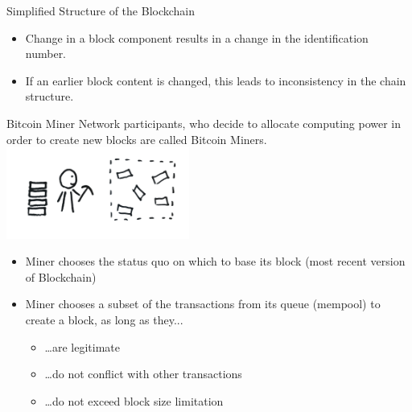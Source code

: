 \documentclass[]{beamer}
\begin{document}
\begin{frame}{Simplified Structure of the Blockchain}
\begin{figure}[h!]
	\center
	
\end{figure}
\begin{itemize}
\item{Change in a block component results in a change in the identification number.}
\item{If an earlier block content is changed, this leads to inconsistency in the chain structure.}
\end{itemize}
\end{frame}


\begin{frame}{Bitcoin Miner}
Network participants, who decide to allocate computing power in order to create new blocks are called Bitcoin Miners.
\center
\includegraphics[width=6cm]{../assets/images/miner.png}

\begin{itemize}
\item{Miner chooses the status quo on which to base its block (most recent version of Blockchain)}
\item{Miner chooses a subset of the transactions from its queue (mempool) to create a block, as long as they...}
	\begin{itemize}
	\item{\dots are legitimate}
	\item{\dots do not conflict with other transactions}
	\item{\dots do not exceed block size limitation}
	\end{itemize}
\end{itemize}
\end{frame}
\end{document}
